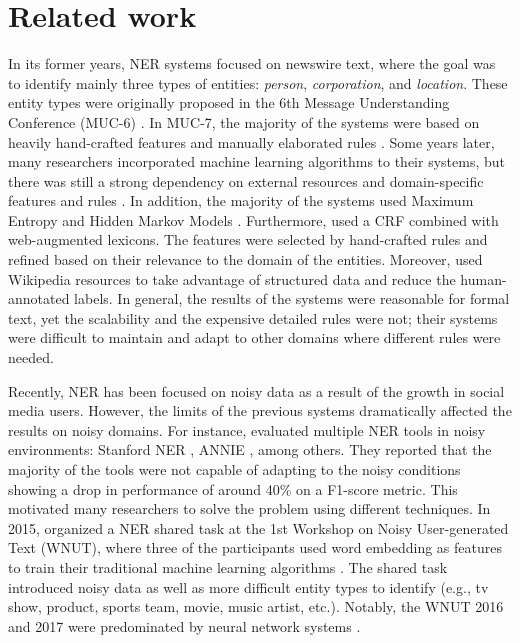 \documentclass[11pt,a4paper]{article}
\begin{document}
\section{Related work}
\label{sec:relatedwork}
In its former years, NER systems focused on newswire text, where the goal was to identify mainly three types of entities: \textit{person}, \textit{corporation}, and \textit{location}. These entity types were originally proposed in the 6th Message Understanding Conference (MUC-6) \cite{Grishman:1996:MUC:992628.992709}. In MUC-7, the majority of the systems were based on heavily hand-crafted features and manually elaborated rules \cite{M98-1018}. Some  years later, many researchers incorporated machine learning algorithms to their systems, but there was still a strong dependency on external resources and domain-specific features and rules \cite{TjongKimSang-DeMeulder:03}. In addition, the majority of the systems used Maximum Entropy \cite{Bender-etAl:2003:CONLL, Chieu-Ng:2003:CONLL, Curran:2003:LIN:1119176.1119200, Florian-etAl:2003:CONLL, Klein:2003:NER:1119176.1119204} and Hidden Markov Models \cite{Florian-etAl:2003:CONLL, Klein:2003:NER:1119176.1119204, Mayfield:2003:NER:1119176.1119205, Whitelaw:2003:NER:1119176.1119208}. Furthermore, \citet{McCallum:2003:ERN:1119176.1119206} used a CRF combined with web-augmented lexicons. The features were selected by hand-crafted rules and refined based on their relevance to the domain of the entities. Moreover, \citet{Nothman:2013:LMN:2405838.2405915} used Wikipedia resources to take advantage of structured data and reduce the human-annotated labels. In general, the results of the systems were reasonable for formal text, yet the scalability and the expensive detailed rules were not; their systems were difficult to maintain and adapt to other domains where different rules were needed.

Recently, NER has been focused on noisy data as a result of the growth in social media users. However, the limits of the previous systems dramatically affected the results on noisy domains. For instance, \citet{DBLP:journals/corr/DerczynskiM0EGTPB14} evaluated multiple NER tools in noisy environments: Stanford NER \cite{Finkel:2005:INI:1219840.1219885}, ANNIE \cite{cunningham-EtAl:2002:ACL}, among others. They reported that the majority of the tools were not capable of adapting to the noisy conditions showing a drop in performance of around 40\% on a F1-score metric. This motivated many researchers to solve the problem using different techniques. In 2015, \citet{baldwin-EtAl:2015:WNUT} organized a NER shared task at the 1st Workshop on Noisy User-generated Text (WNUT), where three of the participants used word embedding as features to train their traditional machine learning algorithms \citep{godin2015multimedia, toh-chen-su:2015:WNUT, cherry-guo-dai:2015:WNUT}. The shared task introduced noisy data as well as more difficult entity types to identify (e.g., tv show, product, sports team, movie, music artist, etc.). Notably, the WNUT 2016 and 2017 were predominated by neural network systems \citep{LimsopathamAndCollier:16, AguilarEtAl:17}.
\end{document}
